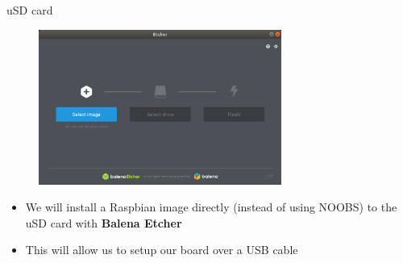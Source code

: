 \begin{frame}
   {uSD card}
   \begin{figure}[H]
      \includegraphics[height=2in]{IMAGES/balene-etcher}
   \end{figure}
   \begin{itemize}
      \item We will install a Raspbian image directly (instead of using NOOBS)
	      to the uSD card with \textbf{Balena Etcher}
      \item This will allow us to setup our board over a USB cable
   \end{itemize}
\end{frame}

\cprotect{}

